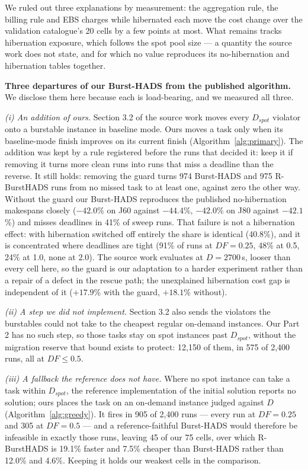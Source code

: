 \documentclass[conference]{IEEEtran}
\begin{document}
We ruled out three explanations by measurement: the aggregation rule, the
billing rule and EBS charges while hibernated each move the cost change over the
validation catalogue's 20 cells by a few points at most. What remains tracks hibernation exposure, which
follows the spot pool size --- a quantity the source work does not state, and
for which no value reproduces its no-hibernation and hibernation tables
together.

\textbf{Three departures of our Burst-HADS from the published algorithm.} We
disclose them here because each is load-bearing, and we measured all three.

\emph{(i) An addition of ours.} Section 3.2 of the source work moves every
$D_{\mathit{spot}}$ violator onto a burstable instance in baseline mode. Ours
moves a task only when its baseline-mode finish improves on its current finish
(Algorithm~\ref{alg:primary}). The addition was kept by a rule registered
before the runs that decided it: keep it if removing it turns more clean runs
into runs that miss a deadline than the reverse. It still holds: removing the
guard turns 974 Burst-HADS and 975 R-BurstHADS runs from no missed task to at
least one, against zero the other way. Without the guard our Burst-HADS
reproduces the published no-hibernation makespans closely ($-42.0$\% on J60
against $-44.4$\%, $-42.0$\% on J80 against $-42.1$\%) and misses deadlines in
41\% of sweep runs. That failure is not a hibernation effect: with hibernation
switched off entirely the share is identical (40.8\%), and it is concentrated
where deadlines are tight (91\% of runs at $\mathit{DF} = 0.25$, 48\% at 0.5,
24\% at 1.0, none at 2.0). The source work evaluates at $D = 2700$\,s, looser
than every cell here, so the guard is our adaptation to a harder experiment
rather than a repair of a defect in the rescue path; the unexplained
hibernation cost gap is independent of it ($+17.9$\% with the guard, $+18.1$\%
without).

\emph{(ii) A step we did not implement.} Section 3.2 also sends the violators
the burstables could not take to the cheapest regular on-demand instances. Our
Part 2 has no such step, so those tasks stay on spot instances past
$D_{\mathit{spot}}$, without the migration reserve that bound exists to
protect: 12{,}150 of them, in 575 of 2{,}400 runs, all at
$\mathit{DF} \leq 0.5$.

\emph{(iii) A fallback the reference does not have.} Where no spot instance can
take a task within $D_{\mathit{spot}}$, the reference implementation of the
initial solution reports no solution; ours places the task on an on-demand
instance judged against $D$ (Algorithm~\ref{alg:greedy}). It fires in 905 of
2{,}400 runs --- every run at $\mathit{DF} = 0.25$ and 305 at
$\mathit{DF} = 0.5$ --- and a reference-faithful Burst-HADS would therefore be
infeasible in exactly those runs, leaving 45 of our 75 cells, over which
R-BurstHADS is 19.1\% faster and 7.5\% cheaper than Burst-HADS rather than
12.0\% and 4.6\%. Keeping it holds our weakest cells in the comparison.
\end{document}
